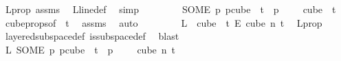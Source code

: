 \begin{isabellebody}
\ L{\isacharunderscore}{\kern0pt}prop\ assms{\isacharparenleft}{\kern0pt}{}{\isacharparenright}{\kern0pt}\ \isamarkupfalse%
\ L{\isacharunderscore}{\kern0pt}line{\isacharunderscore}{\kern0pt}def\ \isamarkupfalse%
\ simp\isanewline
\ \ \ \ \ \isamarkupfalse%
\ \isamarkupfalse%
\ {\isachardoublequoteopen}{\isacharparenleft}{\kern0pt}SOME\ p{\isachardot}{\kern0pt}\ p{\isasymin}cube\ {}\ {\isacharparenleft}{\kern0pt}t{\isacharplus}{\kern0pt}{}{\isacharparenright}{\kern0pt}\ {\isasymand}\ p\ {}\ {\isacharequal}{\kern0pt}\ {}{\isacharparenright}{\kern0pt}\ {\isasymin}\ cube\ {}\ {\isacharparenleft}{\kern0pt}t{\isacharplus}{\kern0pt}{}{\isacharparenright}{\kern0pt}{\isachardoublequoteclose}\ \isamarkupfalse%
\ cube{\isacharunderscore}{\kern0pt}props{\isacharparenleft}{\kern0pt}{}{\isacharparenright}{\kern0pt}{\isacharbrackleft}{\kern0pt}of\ {}\ {\isachardoublequoteopen}t{\isacharplus}{\kern0pt}{}{\isachardoublequoteclose}{\isacharbrackright}{\kern0pt}\ \isamarkupfalse%
\ assms{\isacharparenleft}{\kern0pt}{}{\isacharparenright}{\kern0pt}\ \isamarkupfalse%
\ auto\isanewline
\ \ \ \ \ \isamarkupfalse%
\ \isamarkupfalse%
\ {\isachardoublequoteopen}L\ {\isasymin}\ cube\ {}\ {\isacharparenleft}{\kern0pt}t{\isacharplus}{\kern0pt}{}{\isacharparenright}{\kern0pt}\ {\isasymrightarrow}\isactrlsub E\ cube\ n\ {\isacharparenleft}{\kern0pt}t{\isacharplus}{\kern0pt}{}{\isacharparenright}{\kern0pt}{\isachardoublequoteclose}\ \isamarkupfalse%
\ L{\isacharunderscore}{\kern0pt}prop\ \isamarkupfalse%
\ layered{\isacharunderscore}{\kern0pt}subspace{\isacharunderscore}{\kern0pt}def\ is{\isacharunderscore}{\kern0pt}subspace{\isacharunderscore}{\kern0pt}def\ \isamarkupfalse%
\ blast\isanewline
\ \ \ \ \ \isamarkupfalse%
\ \isamarkupfalse%
\ {\isachardoublequoteopen}L\ {\isacharparenleft}{\kern0pt}SOME\ p{\isachardot}{\kern0pt}\ p{\isasymin}cube\ {}\ {\isacharparenleft}{\kern0pt}t{\isacharplus}{\kern0pt}{}{\isacharparenright}{\kern0pt}\ {\isasymand}\ p\ {}\ {\isacharequal}{\kern0pt}\ {}{\isacharparenright}{\kern0pt}\ {\isasymin}\ cube\ n\ {\isacharparenleft}{\kern0pt}t{\isacharplus}{\kern0pt}{}{\isacharparenright}{\kern0pt}{\isachardoublequoteclose}\ \isamarkupfalse%

\end{isabellebody}
